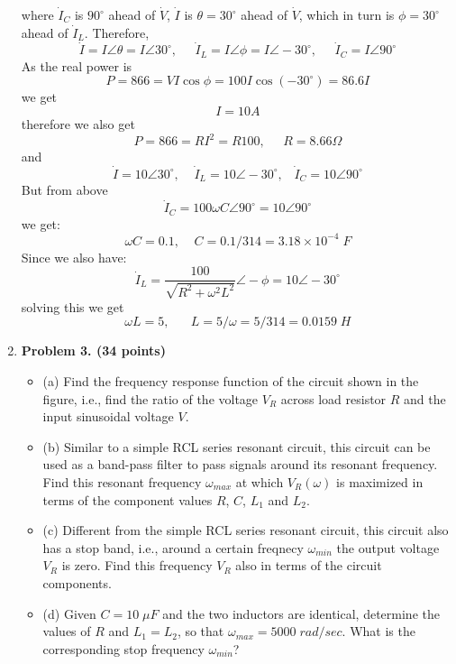 \begin{enumerate}
where $\dot{I}_C$ is $90^\circ$ ahead of $\dot{V}$, $\dot{I}$ is $\theta=30^\circ$
ahead of $\dot{V}$, which in turn is $\phi=30^\circ$ ahead of $\dot{I}_L$. Therefore,
\[ \dot{I}=I\angle \theta=I\angle 30^\circ,\;\;\;\;\;\dot{I}_L=I\angle \phi=I\angle -30^\circ,
\;\;\;\;\;\dot{I}_C=I\angle 90^\circ  \]
As the real power is 
\[ P=866=V I \cos\phi =100 I \cos (-30^\circ)=86.6 I \]
we get
\[ I=10 A \]
therefore we also get
\[ P=866=RI^2=R 100,\;\;\;\;\;R=8.66 \Omega \]
and
\[ \dot{I}=10\angle 30^\circ,\;\;\;\;\dot{I}_L=10\angle -30^\circ,\;\;\;\dot{I}_C=10\angle 90^\circ  \]
But from above
\[ \dot{I}_C=100\omega C \angle 90^\circ=10\angle 90^\circ \]
we get:
\[ \omega C=0.1,\;\;\;\;C=0.1/314=3.18\times 10^{-4} \; F\]
Since we also have:
\[ \dot{I}_L=\frac{100}{\sqrt{R^2+\omega^2 L^2}}\angle -\phi=10\angle -30^\circ \]
solving this we get
\[ \omega L=5,\;\;\;\;\;\;L=5/\omega=5/314=0.0159\;H \]


\item {\bf Problem 3. (34 points)} 

\begin{itemize}
\item (a) Find the frequency response function of the circuit shown in 
the figure, i.e., find the ratio of the voltage $V_R$ across load resistor
$R$ and the input sinusoidal voltage $V$. 

\item (b) Similar to a simple RCL series resonant circuit, this circuit
can be used as a band-pass filter to pass signals around its resonant 
frequency. Find this resonant frequency $\omega_{max}$ at which 
$V_R(\omega)$ is maximized in terms of the component values $R$, $C$, 
$L_1$ and $L_2$. 

\item (c) Different from the simple RCL series resonant circuit, this 
circuit also has a stop band, i.e., around a certain freqnecy 
$\omega_{min}$ the output voltage $V_R$ is zero. Find this frequency 
$V_R$ also in terms of the circuit components. 

\item (d) Given $C=10\;\mu F$ and the two inductors are identical, 
determine the values of $R$ and $L_1=L_2$, so that $\omega_{max}=5000
\;rad/sec$. What is the corresponding stop frequency $\omega_{min}$?

\end{itemize}



\end{enumerate}

